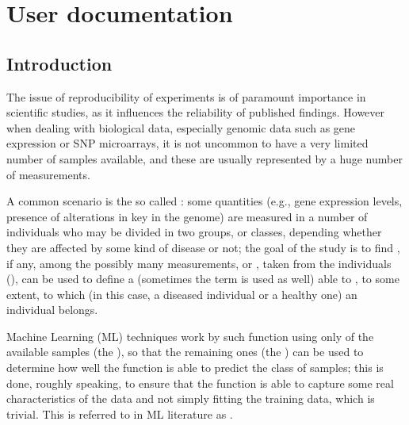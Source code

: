 \documentclass[letterpaper,10pt,english]{sphinxmanual}
\begin{document}
\chapter{User documentation}
\label{\detokenize{index:palladio-parallel-framework-for-model-selection}}\label{\detokenize{index:user-documentation}}

\section{Introduction}
\label{\detokenize{introduction:introduction}}\label{\detokenize{introduction::doc}}\label{\detokenize{introduction:id1}}
The issue of reproducibility of experiments is of paramount importance in scientific studies, as it influences the reliability of published findings. However when dealing with biological data, especially genomic data such as gene expression or SNP microarrays, it is not uncommon to have a very limited number of samples available, and these are usually represented by a huge number of measurements.

A common scenario is the so called : some quantities (e.g., gene expression levels, presence of alterations in key  in the genome) are measured in a number of individuals who may be divided in two groups, or classes, depending whether they are affected by some kind of disease or not; the goal of the study is to find , if any, among the possibly many measurements, or , taken from the individuals (), can be used to define a  (sometimes the term  is used as well) able to , to some extent, to which  (in this case, a diseased individual or a healthy one) an individual belongs.

Machine Learning (ML) techniques work by  such function using only  of the available samples (the ), so that the remaining ones (the ) can be used to determine how well the function is able to predict the class of  samples; this is done, roughly speaking, to ensure that the function is able to capture some real characteristics of the data and not simply fitting the training data, which is trivial.
This is referred to in ML literature as .
\end{document}
